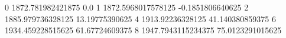 0 1872.781982421875 0.0
1 1872.5968017578125 -0.1851806640625
2 1885.979736328125 13.19775390625
4 1913.92236328125 41.140380859375
6 1934.459228515625 61.67724609375
8 1947.7943115234375 75.0123291015625
